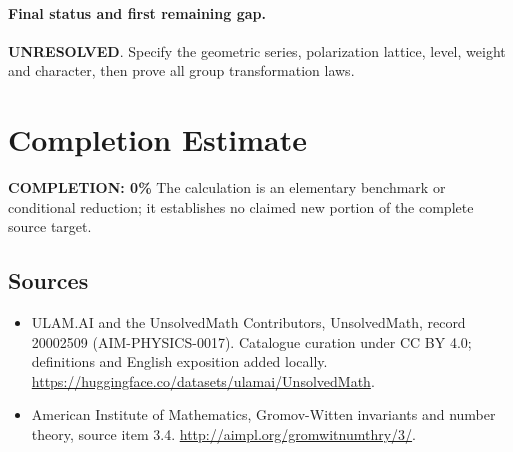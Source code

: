 \documentclass[11pt]{article}
\begin{document}
\paragraph{Final status and first remaining gap.}
\textbf{UNRESOLVED}. Specify the geometric series, polarization lattice, level, weight and character, then prove all group transformation laws.

\section{Completion Estimate}
\noindent\textbf{COMPLETION: 0\%}
The calculation is an elementary benchmark or conditional reduction; it establishes no claimed new portion of the complete source target.

\subsection{Sources}
\begin{itemize}
\item[\hypertarget{source:20002509:1}{S1}] ULAM.AI and the UnsolvedMath Contributors, UnsolvedMath, record 20002509 (AIM-PHYSICS-0017). Catalogue curation under CC BY 4.0; definitions and English exposition added locally.
\url{https://huggingface.co/datasets/ulamai/UnsolvedMath}.
\item[\hypertarget{source:20002509:2}{S2}] American Institute of Mathematics, Gromov-Witten invariants and number theory, source item 3.4.
\url{http://aimpl.org/gromwitnumthry/3/}.
\end{itemize}
\label{end:20002509}
\end{document}
